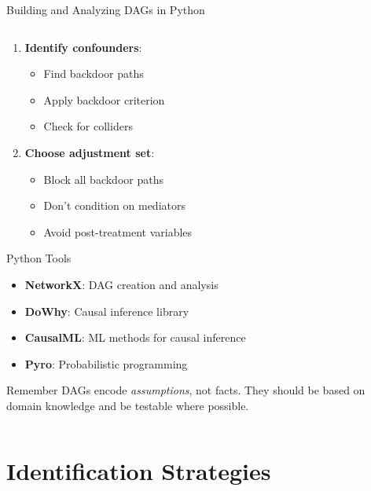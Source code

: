 \documentclass[aspectratio=169,11pt]{beamer}
\begin{document}
\begin{frame}[fragile]{Building and Analyzing DAGs in Python}
\begin{columns}
\begin{column}{0.45\textwidth}
\begin{enumerate}
\item \textbf{Identify confounders}:
   \begin{itemize}
   \item Find backdoor paths
   \item Apply backdoor criterion
   \item Check for colliders
   \end{itemize}

\item \textbf{Choose adjustment set}:
   \begin{itemize}
   \item Block all backdoor paths
   \item Don't condition on mediators
   \item Avoid post-treatment variables
   \end{itemize}
\end{enumerate}

\vspace{0.3cm}
\begin{block}{Python Tools}
\begin{itemize}
\item \textbf{NetworkX}: DAG creation and analysis
\item \textbf{DoWhy}: Causal inference library
\item \textbf{CausalML}: ML methods for causal inference
\item \textbf{Pyro}: Probabilistic programming
\end{itemize}
\end{block}

\begin{alertblock}{Remember}
DAGs encode \emph{assumptions}, not facts. They should be based on domain knowledge and be testable where possible.
\end{alertblock}
\end{column}
\end{columns}
\end{frame}

\section{Identification Strategies}
\end{document}
